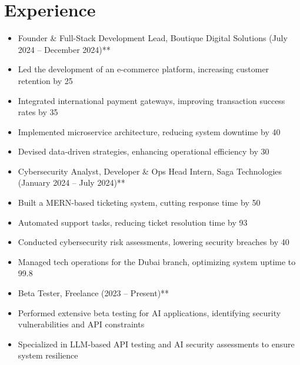 \documentclass[10pt]{article}
\begin{document}
\section*{Experience}
\vspace{0.05cm}
\begin{itemize}[leftmargin=0.5cm, itemsep=2pt]

  \item Founder & Full-Stack Development Lead, Boutique Digital Solutions (July 2024 – December 2024)**

  \item Led the development of an e-commerce platform, increasing customer retention by 25%

  \item Integrated international payment gateways, improving transaction success rates by 35%

  \item Implemented microservice architecture, reducing system downtime by 40%

  \item Devised data-driven strategies, enhancing operational efficiency by 30%

  \item Cybersecurity Analyst, Developer & Ops Head Intern, Saga Technologies (January 2024 – July 2024)**

  \item Built a MERN-based ticketing system, cutting response time by 50%

  \item Automated support tasks, reducing ticket resolution time by 93%

  \item Conducted cybersecurity risk assessments, lowering security breaches by 40%

  \item Managed tech operations for the Dubai branch, optimizing system uptime to 99.8%

  \item Beta Tester, Freelance (2023 – Present)**

  \item Performed extensive beta testing for AI applications, identifying security vulnerabilities and API constraints

  \item Specialized in LLM-based API testing and AI security assessments to ensure system resilience

\end{itemize}
\end{document}
